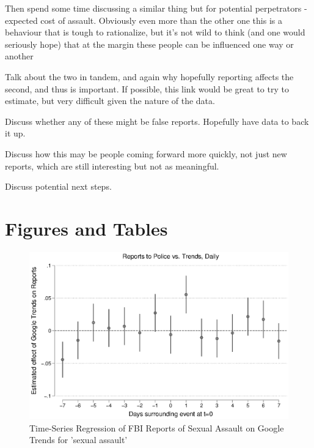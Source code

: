 \documentclass[AER,draftmode]{AEA}
\begin{document}
Then spend some time discussing a similar thing but for potential perpetrators - expected cost of assault. Obviously even more than the other one this is a behaviour that is tough to rationalize, but it's not wild to think (and one would seriously hope) that at the margin these people can be influenced one way or another

Talk about the two in tandem, and again why hopefully reporting affects the second, and thus is important. If possible, this link would be great to try to estimate, but very difficult given the nature of the data. 

Discuss whether any of these might be false reports. Hopefully have data to back it up.

Discuss how this may be people coming forward more quickly, not just new reports, which are still interesting but not as meaningful.

Discuss potential next steps.


\clearpage
\section{Figures and Tables}

\begin{figure}
\includegraphics[width=\linewidth]{figures/police_trend_daily_logboth.eps}
\caption{Time-Series Regression of FBI Reports of Sexual Assault on Google Trends for 'sexual assault'} \label{figure:police_trends_daily_logboth}
\end{figure}
\end{document}
